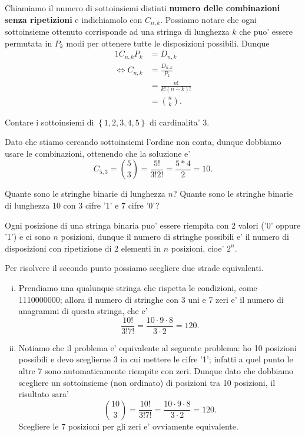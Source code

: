 Chiamiamo il numero di sottoinsiemi distinti \textbf{numero delle combinazioni senza ripetizioni} e indichiamolo con $C_{n, k}$. Possiamo notare che ogni sottoinsieme ottenuto corrisponde ad una stringa di lunghezza $k$ che puo' essere permutata in $P_k$ modi per ottenere tutte le disposizioni possibili. Dunque \begin{alignat*}
    {1}
    C_{n, k}P_k   &= D_{n, k}  \\
    \iff C_{n, k} &= \frac{D_{n,k}}{P_k}\\
                  &= \frac{n!}{k!(n-k)!} \\
                  &= \binom{n}{k}.
\end{alignat*}

\begin{example}
    Contare i sottoinsiemi di $\left\{ 1, 2, 3, 4, 5\right\}$ di cardinalita' $3$.
\end{example}
\begin{solution}
    Dato che stiamo cercando sottoinsiemi l'ordine non conta, dunque dobbiamo usare le combinazioni, ottenendo che la soluzione e' \[
        C_{5, 3} = \binom{5}{3} =  \frac{5!}{3!2!} = \frac{5*4}{2} = 10
    .\]
\end{solution}

\begin{example}
    Quante sono le stringhe binarie di lunghezza $n$? Quante sono le stringhe binarie di lunghezza $10$ con $3$ cifre '$1$' e $7$ cifre '$0$'?
\end{example}
\begin{solution}
    Ogni posizione di una stringa binaria puo' essere riempita con $2$ valori ('0' oppure '1') e ci sono $n$ posizioni, dunque il numero di stringhe possibili e' il numero di disposizioni con ripetizione di $2$ elementi in $n$ posizioni, cioe' $2^n$.

    Per risolvere il secondo punto possiamo scegliere due strade equivalenti.
    \begin{enumerate}[(i)]
        \item Prendiamo una qualunque stringa che rispetta le condizioni, come 1110000000; allora il numero di stringhe con 3 uni e 7 zeri e' il numero di anagrammi di questa stringa, che e' \[
            \frac{10!}{3!7!} = \frac{10 \cdot 9 \cdot 8}{3 \cdot 2} = 120.   
        \]
        \item Notiamo che il problema e' equivalente al seguente problema: ho 10 posizioni possibili e devo sceglierne 3 in cui mettere le cifre '1'; infatti a quel punto le altre 7 sono automaticamente riempite con zeri. Dunque dato che dobbiamo scegliere un sottoinsieme (non ordinato) di posizioni tra 10 posizioni, il risultato sara' \[
            \binom{10}{3} = \frac{10!}{3!7!} = \frac{10 \cdot 9 \cdot 8}{3 \cdot 2} = 120.   
        \]
        Scegliere le 7 posizioni per gli zeri e' ovviamente equivalente.
    \end{enumerate}
\end{solution}

